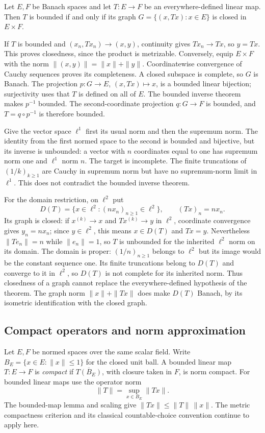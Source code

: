 \begin{theorem}
\label{thm:closed_graph}
Let $E,F$ be Banach spaces and let $T:E\to F$ be an everywhere-defined
linear map. Then $T$ is bounded if and only if its graph
$G=\{(x,Tx):x\in E\}$ is closed in $E\times F$.
\end{theorem}
\Proof
If $T$ is bounded and $(x_n,Tx_n)\to(x,y)$, continuity gives
$Tx_n\to Tx$, so $y=Tx$. This proves closedness, since the product
is metrizable. Conversely, equip $E\times F$ with the norm
$\|(x,y)\|=\|x\|+\|y\|$. Coordinatewise convergence of Cauchy
sequences proves its completeness. A closed subspace is complete,
so $G$ is Banach. The projection $p:G\to E$, $(x,Tx)\mapsto x$,
is a bounded linear bijection; surjectivity uses that $T$ is defined
on all of $E$. The bounded inverse theorem makes $p^{-1}$ bounded.
The second-coordinate projection $q:G\to F$ is bounded, and
$T=q\circ p^{-1}$ is therefore bounded.
\Done

\begin{example}
Give the vector space $\ell^1$ first its usual norm and then the
supremum norm. The identity from the first normed space to the second
is bounded and bijective, but its inverse is unbounded: a vector with
$n$ coordinates equal to one has supremum norm one and $\ell^1$ norm
$n$. The target is incomplete. The finite truncations of $(1/k)_{k\geq1}$
are Cauchy in supremum norm but have no supremum-norm limit in $\ell^1$.
This does not contradict the bounded inverse theorem.

For the domain restriction, on $\ell^2$ put
\[
D(T)=\{x\in\ell^2:(n x_n)_{n\geq1}\in\ell^2\},
\qquad (Tx)_n=n x_n.
\]
Its graph is closed: if $x^{(k)}\to x$ and $Tx^{(k)}\to y$ in
$\ell^2$, coordinate convergence gives $y_n=nx_n$; since $y\in\ell^2$,
this means $x\in D(T)$ and $Tx=y$. Nevertheless
$\|Te_n\|=n$ while $\|e_n\|=1$, so $T$ is unbounded for the inherited
$\ell^2$ norm on its domain. The domain is proper: $(1/n)_{n\geq1}$
belongs to $\ell^2$ but its image would be the constant sequence one.
Its finite truncations belong to $D(T)$ and converge to it in $\ell^2$,
so $D(T)$ is not complete for its inherited norm.
Thus closedness of a graph cannot replace the everywhere-defined
hypothesis of the theorem. The graph norm $\|x\|+\|Tx\|$ does make
$D(T)$ Banach, by its isometric identification with the closed graph.
\end{example}

\subsection{Compact operators and norm approximation}
Let $E,F$ be normed spaces over the same scalar field. Write
$B_E=\{x\in E:\|x\|\leq1\}$ for the closed unit ball.
A bounded linear map $T:E\to F$ is \emph{compact} if
$\overline{T(B_E)}$, with closure taken in $F$, is norm compact.
For bounded linear maps use the operator norm
\[
\|T\|=\sup_{x\in B_E}\|Tx\|.
\]
The bounded-map lemma and scaling give
$\|Tx\|\leq\|T\|\,\|x\|$. The metric compactness criterion and
its classical countable-choice convention continue to apply here.

